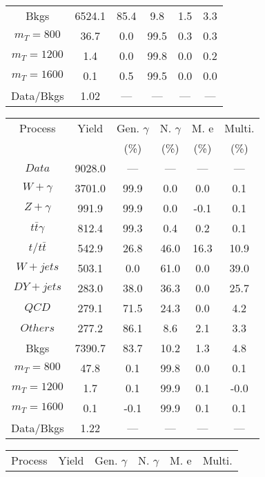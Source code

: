 \begin{figure}
\begin{minipage}[c]{0.32\textwidth}
{\begin{tabular}{cccccc}
Bkgs &  6524.1 &  85.4 &  9.8 &  1.5 &  3.3\\
$ m_{T} = 800 $ &  36.7 &  0.0 &  99.5 &  0.3 &  0.3\\
$ m_{T} = 1200 $ &  1.4 &  0.0 &  99.8 &  0.0 &  0.2\\
$ m_{T} = 1600 $ &  0.1 &  0.5 &  99.5 &  0.0 &  0.0\\
Data/Bkgs &  1.02 &  --- &  --- &  --- &  ---\\
\hline
\end{tabular}
}
\end{minipage}
\begin{minipage}[c]{0.32\textwidth}
\centering
\tiny{
\begin{tabular}{cccccc}
\hline
Process & Yield & Gen. $\gamma$ & N. $\gamma$ & M. e & Multi. \\
 &  & (\%) & (\%) & (\%) & (\%)  \\
\hline
                                                                      $ Data $ &  9028.0 &  --- &  --- &  --- &  ---\\
$ W+\gamma $ &  3701.0 &  99.9 &  0.0 &  0.0 &  0.1\\
$ Z+\gamma $ &  991.9 &  99.9 &  0.0 &  -0.1 &  0.1\\
$ t\bar{t}\gamma $ &  812.4 &  99.3 &  0.4 &  0.2 &  0.1\\
$ t/t\bar{t} $ &  542.9 &  26.8 &  46.0 &  16.3 &  10.9\\
$ W+jets $ &  503.1 &  0.0 &  61.0 &  0.0 &  39.0\\
$ DY+jets $ &  283.0 &  38.0 &  36.3 &  0.0 &  25.7\\
$ QCD $ &  279.1 &  71.5 &  24.3 &  0.0 &  4.2\\
$ Others $ &  277.2 &  86.1 &  8.6 &  2.1 &  3.3\\
Bkgs &  7390.7 &  83.7 &  10.2 &  1.3 &  4.8\\
$ m_{T} = 800 $ &  47.8 &  0.1 &  99.8 &  0.0 &  0.1\\
$ m_{T} = 1200 $ &  1.7 &  0.1 &  99.9 &  0.1 &  -0.0\\
$ m_{T} = 1600 $ &  0.1 &  -0.1 &  99.9 &  0.1 &  0.1\\
Data/Bkgs &  1.22 &  --- &  --- &  --- &  ---\\
\hline
\end{tabular}
}
\end{minipage}
\begin{minipage}[c]{0.32\textwidth}
\centering
\tiny{
\begin{tabular}{cccccc}
\hline
Process & Yield & Gen. $\gamma$ & N. $\gamma$ & M. e & Multi. \\

\end{tabular}}
\end{minipage}
\end{figure}
